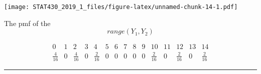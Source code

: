 \documentclass[]{article}
\begin{document}
\texttt{[image: STAT430\_2019\_1\_files/figure-latex/unnamed-chunk-14-1.pdf]}

The pmf of the \[range( Y_1, Y_2)\]

\[
\begin{array}{c|c|c|c|c|c|c|c|c|c|c|c|c|c|c}
0 & 1 & 2 & 3 & 4 & 5 & 6 & 7 & 8 & 9 & 10 & 11 & 12 & 13 & 14\\\hline
\frac{4}{16}& 0&\frac{4}{16}&0&\frac{2}{16}&0 & 0 & 0&0& 0&\frac{2}{16}&0 & \frac{2}{16} & 0 & \frac{2}{16} 
\end{array}
\]

\begin{center}\rule{0.5\linewidth}{\linethickness}\end{center}
\end{document}
